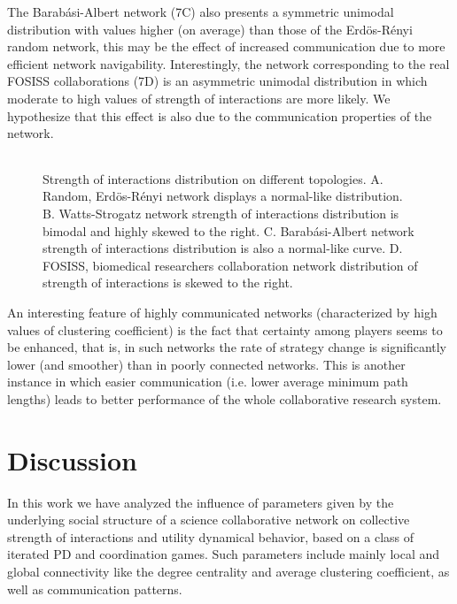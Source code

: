 \documentclass{bmcart}
\def\texttt{[image: ]}
\begin{document}
The Barab\'asi-Albert network (7C) also presents a symmetric unimodal
distribution with values higher (on average) than those of the
Erd\"{o}s-R\'enyi random network, this may be the effect of increased
communication due to more efficient network
navigability. Interestingly, the network corresponding to the real
FOSISS collaborations (7D) is an asymmetric unimodal distribution in
which moderate to high values of strength of interactions are more
likely. We hypothesize that this effect is also due to the
communication properties of the
network. \\

\begin{figure} [h!]
\centering
\begin{tabular}{cc}

\end{tabular}
\caption{Strength of interactions distribution on different topologies. A. Random, Erd\"{o}s-R\'enyi network displays a normal-like
distribution. B. Watts-Strogatz network strength of interactions distribution is bimodal and highly skewed to the right. C.
Barab\'asi-Albert network strength of interactions distribution is also a
normal-like curve. D. FOSISS, biomedical researchers collaboration network distribution of strength of interactions is skewed to the right.}\label{histo_trust}  
\end{figure}


An interesting feature of highly communicated networks (characterized
by high values of clustering coefficient) is the fact that certainty
among players seems to be enhanced, that is, in such networks the rate
of strategy change is significantly lower (and smoother) than in
poorly connected networks. This is another instance in which easier
communication (i.e. lower average minimum path lengths) leads to better
performance of the whole collaborative research system.\\

\section*{Discussion}
\label{sec:3}

In this work we have analyzed the influence of parameters
  given by the underlying social structure of a science collaborative
  network on collective strength of interactions and utility dynamical
  behavior, based on a class of iterated PD and coordination
  games. Such parameters include mainly local and global connectivity
  like the degree centrality and average clustering coefficient, as
  well as communication patterns.\\
\end{document}
